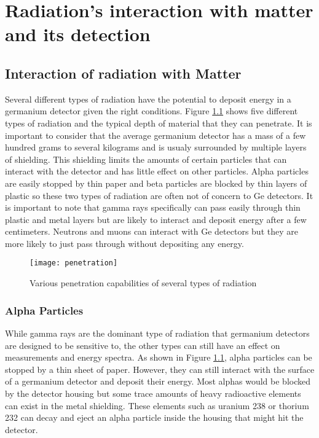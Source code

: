 \chapter{Radiation's interaction with matter and its detection}

\section{Interaction of radiation with Matter}
Several different types of radiation have the potential to deposit energy in a germanium detector given the right conditions.
Figure \ref{fig:penetration} shows five different types of radiation and the typical depth of material that they can penetrate.
It is important to consider that the average germanium detector has a mass of a few hundred grams to several kilograms and is usualy surrounded by multiple layers of shielding.
This shielding limits the amounts of certain particles that can interact with the detector and has little effect on other particles.
Alpha particles are easily stopped by thin paper and beta particles are blocked by thin layers of plastic so these two types of radiation are often not of concern to Ge detectors.
It is important to note that gamma rays specifically can pass easily through thin plastic and metal layers but are likely to interact and deposit energy after a few centimeters.
Neutrons and muons can interact with Ge detectors but they are more likely to just pass through without depositing any energy.
\begin{figure}[htpb]
\centering
\texttt{[image: penetration]}
\caption{Various penetration capabilities of several types of radiation}
\label{fig:penetration}
\end{figure}

\subsection{Alpha Particles}
While gamma rays are the dominant type of radiation that germanium detectors are designed to be sensitive to, the other types can still have an effect on measurements and energy spectra.
As shown in Figure \ref{fig:penetration}, alpha particles can be stopped by a thin sheet of paper.
However, they can still interact with the surface of a germanium detector and deposit their energy.
Most alphas would be blocked by the detector housing but some trace amounts of heavy radioactive elements can exist in the metal shielding.
These elements such as uranium 238 or thorium 232 can decay and eject an alpha particle inside the housing that might hit the detector.

